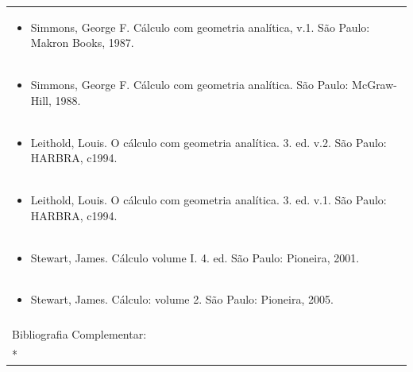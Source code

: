 \documentclass[11pt]{article}
\begin{document}
\begin{center}
\begin{longtable}{|p{4cm}|p{4cm}|p{4cm}|p{4cm}|}
\multicolumn{4}{|p{\dimexpr 16cm + 6\tabcolsep\relax}|}{\begin{itemize}\item Simmons, George F. Cálculo com geometria analítica, v.1. São Paulo: Makron Books, 1987.\end{itemize}}\\
\multicolumn{4}{|p{\dimexpr 16cm + 6\tabcolsep\relax}|}{\begin{itemize}\item Simmons, George F. Cálculo com geometria analítica. São Paulo: McGraw-Hill, 1988.\end{itemize}}\\
\multicolumn{4}{|p{\dimexpr 16cm + 6\tabcolsep\relax}|}{\begin{itemize}\item Leithold, Louis. O cálculo com geometria analítica. 3. ed. v.2. São Paulo: HARBRA, c1994.\end{itemize}}\\
\multicolumn{4}{|p{\dimexpr 16cm + 6\tabcolsep\relax}|}{\begin{itemize}\item Leithold, Louis. O cálculo com geometria analítica. 3. ed. v.1. São Paulo: HARBRA, c1994.\end{itemize}}\\
\multicolumn{4}{|p{\dimexpr 16cm + 6\tabcolsep\relax}|}{\begin{itemize}\item Stewart, James. Cálculo volume I. 4. ed. São Paulo: Pioneira, 2001.\end{itemize}}\\
\multicolumn{4}{|p{\dimexpr 16cm + 6\tabcolsep\relax}|}{\begin{itemize}\item Stewart, James. Cálculo: volume 2. São Paulo: Pioneira, 2005.\end{itemize}}\\
\multicolumn{4}{|p{16cm}|}{}\\
\hline
\multicolumn{4}{|p{16cm}|}{Bibliografia Complementar:}\\*
\multicolumn{4}{|p{\dimexpr 16cm + 6\tabcolsep\relax}|}{\begin{itemize}\item[] (nenhum item informado)\end{itemize}}\\
\hline
\end{longtable}
\end{center}
\end{document}

